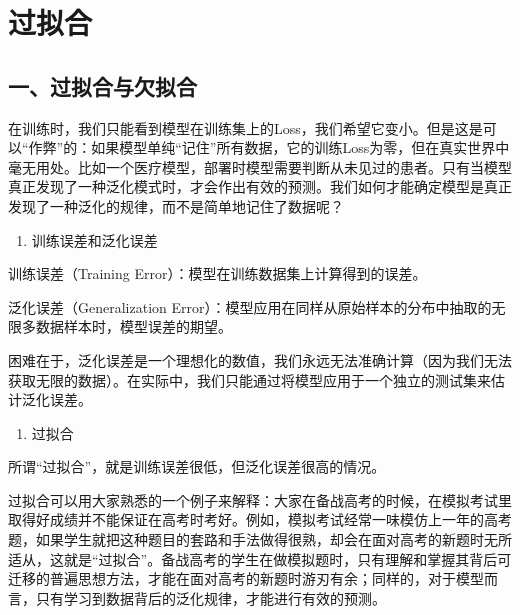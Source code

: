 \clearpage

\hypertarget{ux8fc7ux62dfux5408}{%
\section{过拟合}\label{ux8fc7ux62dfux5408}}

\hypertarget{ux4e00ux8fc7ux62dfux5408ux4e0eux6b20ux62dfux5408}{%
\subsection{一、过拟合与欠拟合}\label{ux4e00ux8fc7ux62dfux5408ux4e0eux6b20ux62dfux5408}}

在训练时，我们只能看到模型在训练集上的Loss，我们希望它变小。但是这是可以``作弊''的：如果模型单纯``记住''所有数据，它的训练Loss为零，但在真实世界中毫无用处。比如一个医疗模型，部署时模型需要判断从未见过的患者。只有当模型真正发现了一种泛化模式时，才会作出有效的预测。我们如何才能确定模型是真正发现了一种泛化的规律，而不是简单地记住了数据呢？

\begin{enumerate}
\def\labelenumi{\arabic{enumi}.}
\tightlist
\item
  训练误差和泛化误差
\end{enumerate}

训练误差（Training Error）：模型在训练数据集上计算得到的误差。

泛化误差（Generalization Error）：模型应用在同样从原始样本的分布中抽取的无限多数据样本时，模型误差的期望。

困难在于，泛化误差是一个理想化的数值，我们永远无法准确计算（因为我们无法获取无限的数据）。在实际中，我们只能通过将模型应用于一个独立的测试集来估计泛化误差。

\begin{enumerate}
\def\labelenumi{\arabic{enumi}.}
\setcounter{enumi}{1}
\tightlist
\item
  过拟合
\end{enumerate}

所谓``过拟合''，就是训练误差很低，但泛化误差很高的情况。

过拟合可以用大家熟悉的一个例子来解释：大家在备战高考的时候，在模拟考试里取得好成绩并不能保证在高考时考好。例如，模拟考试经常一味模仿上一年的高考题，如果学生就把这种题目的套路和手法做得很熟，却会在面对高考的新题时无所适从，这就是``过拟合''。备战高考的学生在做模拟题时，只有理解和掌握其背后可迁移的普遍思想方法，才能在面对高考的新题时游刃有余；同样的，对于模型而言，只有学习到数据背后的泛化规律，才能进行有效的预测。

